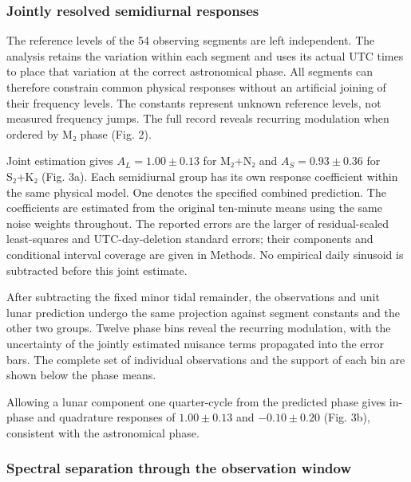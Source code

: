 \documentclass[
  12pt,
  a4paper,
]{article}
\begin{document}
\hypertarget{jointly-resolved-semidiurnal-responses}{%
\subsubsection{Jointly resolved semidiurnal
responses}\label{jointly-resolved-semidiurnal-responses}}

The reference levels of the 54 observing segments are left independent.
The analysis retains the variation within each segment and uses its
actual UTC times to place that variation at the correct astronomical
phase. All segments can therefore constrain common physical responses
without an artificial joining of their frequency levels. The constants
represent unknown reference levels, not measured frequency jumps. The
full record reveals recurring modulation when ordered by M₂ phase (Fig.
2).

Joint estimation gives \(A_L=1.00\pm0.13\) for M₂+N₂ and
\(A_S=0.93\pm0.36\) for S₂+K₂ (Fig. 3a). Each semidiurnal group has its
own response coefficient within the same physical model. One denotes the
specified combined prediction. The coefficients are estimated from the
original ten-minute means using the same noise weights throughout. The
reported errors are the larger of residual-scaled least-squares and
UTC-day-deletion standard errors; their components and conditional
interval coverage are given in Methods. No empirical daily sinusoid is
subtracted before this joint estimate.

After subtracting the fixed minor tidal remainder, the observations and
unit lunar prediction undergo the same projection against segment
constants and the other two groups. Twelve phase bins reveal the
recurring modulation, with the uncertainty of the jointly estimated
nuisance terms propagated into the error bars. The complete set of
individual observations and the support of each bin are shown below the
phase means.

Allowing a lunar component one quarter-cycle from the predicted phase
gives in-phase and quadrature responses of \(1.00\pm0.13\) and
\(-0.10\pm0.20\) (Fig. 3b), consistent with the astronomical phase.

\hypertarget{spectral-separation-through-the-observation-window}{%
\subsubsection{Spectral separation through the observation
window}\label{spectral-separation-through-the-observation-window}}
\end{document}
